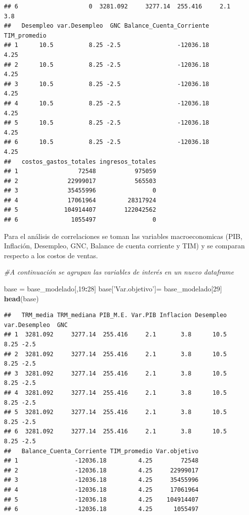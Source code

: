 \documentclass[
  11pt,
]{article}
\newenvironment{Shaded}{\begin{snugshade}}{\end{snugshade}}
\newcommand{\CommentTok}[1]{\textcolor[rgb]{0.56,0.35,0.01}{\textit{#1}}}
\newcommand{\DecValTok}[1]{\textcolor[rgb]{0.00,0.00,0.81}{#1}}
\newcommand{\KeywordTok}[1]{\textcolor[rgb]{0.13,0.29,0.53}{\textbf{#1}}}
\newcommand{\NormalTok}[1]{#1}
\newcommand{\OperatorTok}[1]{\textcolor[rgb]{0.81,0.36,0.00}{\textbf{#1}}}
\newcommand{\StringTok}[1]{\textcolor[rgb]{0.31,0.60,0.02}{#1}}
\begin{document}
\begin{verbatim}
## 6                    0  3281.092     3277.14  255.416     2.1       3.8
##   Desempleo var.Desempleo  GNC Balance_Cuenta_Corriente TIM_promedio
## 1      10.5          8.25 -2.5                -12036.18         4.25
## 2      10.5          8.25 -2.5                -12036.18         4.25
## 3      10.5          8.25 -2.5                -12036.18         4.25
## 4      10.5          8.25 -2.5                -12036.18         4.25
## 5      10.5          8.25 -2.5                -12036.18         4.25
## 6      10.5          8.25 -2.5                -12036.18         4.25
##   costos_gastos_totales ingresos_totales
## 1                 72548           975059
## 2              22999017           565503
## 3              35455996                0
## 4              17061964         28317924
## 5             104914407        122042562
## 6               1055497                0
\end{verbatim}

Para el análisis de correlaciones se toman las variables macroeconomicas
(PIB, Inflación, Desempleo, GNC, Balance de cuenta corriente y TIM) y se
comparan respecto a los costos de ventas.

\begin{Shaded}
\begin{Highlighting}[]
\CommentTok{#A continuación se agrupan las variables de interés en un nuevo dataframe}

\NormalTok{base =}\StringTok{ }\NormalTok{base_modelado[,}\DecValTok{19}\OperatorTok{:}\DecValTok{28}\NormalTok{]}
\NormalTok{base[}\StringTok{'Var.objetivo'}\NormalTok{]=}\StringTok{ }\NormalTok{base_modelado[}\DecValTok{29}\NormalTok{]}
\KeywordTok{head}\NormalTok{(base)}
\end{Highlighting}
\end{Shaded}

\begin{verbatim}
##   TRM_media TRM_mediana PIB_M.E. Var.PIB Inflacion Desempleo var.Desempleo  GNC
## 1  3281.092     3277.14  255.416     2.1       3.8      10.5          8.25 -2.5
## 2  3281.092     3277.14  255.416     2.1       3.8      10.5          8.25 -2.5
## 3  3281.092     3277.14  255.416     2.1       3.8      10.5          8.25 -2.5
## 4  3281.092     3277.14  255.416     2.1       3.8      10.5          8.25 -2.5
## 5  3281.092     3277.14  255.416     2.1       3.8      10.5          8.25 -2.5
## 6  3281.092     3277.14  255.416     2.1       3.8      10.5          8.25 -2.5
##   Balance_Cuenta_Corriente TIM_promedio Var.objetivo
## 1                -12036.18         4.25        72548
## 2                -12036.18         4.25     22999017
## 3                -12036.18         4.25     35455996
## 4                -12036.18         4.25     17061964
## 5                -12036.18         4.25    104914407
## 6                -12036.18         4.25      1055497
\end{verbatim}
\end{document}
